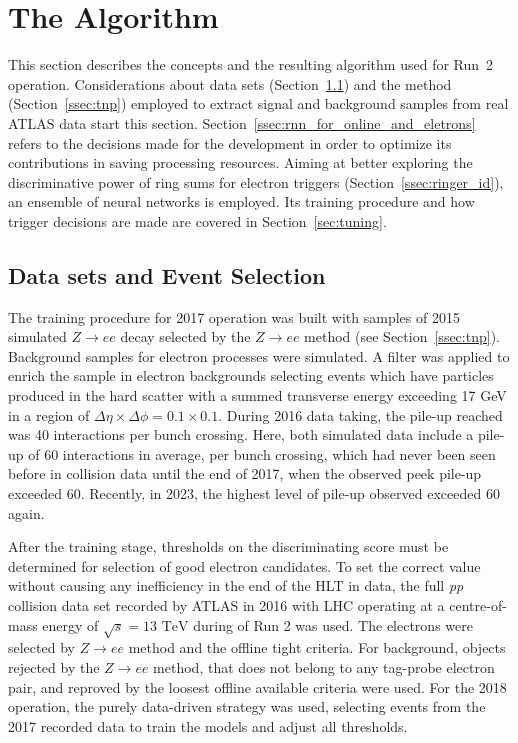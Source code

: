 \section{The \rnn{} Algorithm}%
\label{sec:neuralringer}

This section describes the \rnn{} concepts and the resulting algorithm used for Run~2
operation. Considerations about data sets (Section~\ref{ssec:dataset}) and the \TnP method
(Section~\ref{ssec:tnp}) employed to extract signal and background samples
from real ATLAS data start this section. Section~\ref{ssec:rnn_for_online_and_eletrons} refers to the
decisions made for the \rnn{} development in order to optimize its contributions in saving processing resources. Aiming at better exploring the discriminative
power of ring sums for electron triggers (Section~\ref{ssec:ringer_id}),
an ensemble of neural networks is employed. Its training procedure and how trigger decisions are made are covered in Section~\ref{sec:tuning}.




\subsection{Data sets and Event Selection}%
\label{ssec:dataset}

The training procedure for 2017 operation was built with samples of 2015 simulated $Z\rightarrow ee$ decay selected by the $Z\rightarrow ee$ \TnP method (see Section~\ref{ssec:tnp}). Background samples for electron processes were simulated. A filter was applied to enrich the sample in electron backgrounds selecting events which have particles produced in the hard scatter with a summed transverse energy exceeding 17 GeV in a region of $\Delta\eta\times\Delta\phi=0.1\times0.1$. During 2016 data taking, the pile-up reached was 40 interactions per bunch crossing.
Here, both simulated data include a pile-up of 60 interactions in average, per bunch crossing, which had never been seen before in collision data until the end of 2017, when the observed peek pile-up exceeded 60. Recently, in 2023, the highest level of pile-up observed exceeded 60 again.

After the training stage, thresholds on the discriminating score must be determined for selection of good electron candidates. To set the correct value without causing any inefficiency in the end of the HLT in data, the full \textit{pp} collision data set recorded by ATLAS in 2016 with LHC operating at a centre-of-mass energy of $\sqrt{s}=13\text{ TeV}$ during of Run 2 was used. The electrons were selected by $Z\rightarrow ee$ \TnP method and the offline tight criteria. For background, objects rejected by the $Z\rightarrow ee$ \TnP method, that does not belong to any tag-probe electron pair, and reproved by the loosest offline available criteria were used. For the 2018 operation, the purely data-driven strategy was used, selecting events from the 2017 recorded data to train the models and adjust all thresholds.

